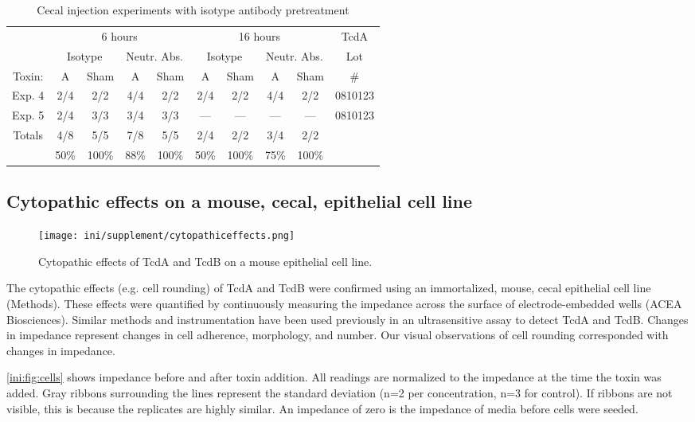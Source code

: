 \begin{table}[ht]
\centering
\begin{tabular}{ c | c c | c c | c c | c c | c }
   & \multicolumn{4}{c|}{6 hours} & \multicolumn{4}{c|}{16 hours} & TcdA  \\
   & \multicolumn{2}{c|}{Isotype} & \multicolumn{2}{c|}{Neutr. Abs.} &
     \multicolumn{2}{c|}{Isotype} & \multicolumn{2}{c|}{Neutr. Abs.} & Lot \\
   Toxin: & A & Sham & A & Sham & A & Sham & A & Sham & \# \\ \hline
   Exp. 4 & 2/4 & 2/2 & 4/4 & 2/2 & 2/4 & 2/2 & 4/4 & 2/2 & 0810123 \\
   Exp. 5 & 2/4 & 3/3 & 3/4 & 3/3 & --- & --- & --- & --- & 0810123 \\ \hline
   Totals & 4/8 & 5/5 & 7/8 & 5/5 & 2/4 & 2/2 & 3/4 & 2/2 &  \\
    & 50\% & 100\% & 88\% & 100\% & 50\% & 100\% & 75\% & 100\% &  \\
\end{tabular}
\caption{Cecal injection experiments with isotype antibody pretreatment}
\label{ini:tab:absizes}
\end{table}  

\subsection{Cytopathic effects on a mouse, cecal, epithelial cell line}

\begin{figure}[b!]
\centering
\texttt{[image: ini/supplement/cytopathiceffects.png]}
\caption{Cytopathic effects of TcdA and TcdB on a mouse epithelial cell line.}
\label{ini:fig:cells}
\end{figure}

The cytopathic effects (e.g. cell rounding) of TcdA and TcdB were confirmed using an
immortalized, mouse, cecal epithelial cell line (Methods). These effects
were quantified by continuously measuring the impedance across the surface
of electrode-embedded wells (ACEA Biosciences). Similar methods and instrumentation
have been used previously in an ultrasensitive assay to detect TcdA and TcdB. \cite{He:2009hg} 
Changes in impedance represent changes in
cell adherence, morphology, and number. Our visual observations of cell rounding
corresponded with changes in impedance. 

\autoref{ini:fig:cells} shows impedance before and after toxin
addition. All readings are normalized to the impedance
at the time the toxin was added. Gray ribbons surrounding the lines represent
the standard deviation (n=2 per concentration, n=3 for control). If ribbons are not visible, 
this is because the replicates are highly similar. An impedance of zero
is the impedance of media before cells were seeded.

